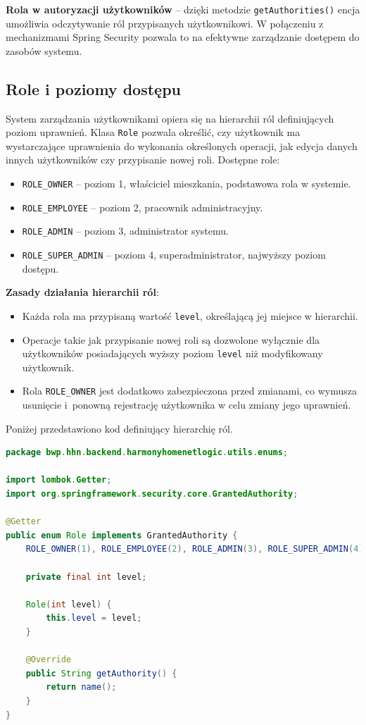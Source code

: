 \noindent \textbf{Rola w autoryzacji użytkowników} -- dzięki metodzie \texttt{getAuthorities()} encja umożliwia odczytywanie ról przypisanych użytkownikowi. W połączeniu z mechanizmami Spring Security pozwala to na efektywne zarządzanie dostępem do zasobów systemu.

\subsection{Role i poziomy dostępu}

System zarządzania użytkownikami opiera się na hierarchii ról definiujących poziom uprawnień. Klasa \texttt{Role} pozwala określić, czy użytkownik ma wystarczające uprawnienia do wykonania określonych operacji, jak edycja danych innych użytkowników czy przypisanie nowej roli. Dostępne role:
\begin{itemize}
    \item \texttt{ROLE\_OWNER} -- poziom 1, właściciel mieszkania, podstawowa rola w systemie.
    \item \texttt{ROLE\_EMPLOYEE} -- poziom 2, pracownik administracyjny.
    \item \texttt{ROLE\_ADMIN} -- poziom 3, administrator systemu.
    \item \texttt{ROLE\_SUPER\_ADMIN} -- poziom 4, superadministrator, najwyższy poziom dostępu.
\end{itemize}

\noindent \textbf{Zasady działania hierarchii ról}:
\begin{itemize}
    \item Każda rola ma przypisaną wartość \texttt{level}, określającą jej miejsce w hierarchii.
    \item Operacje takie jak przypisanie nowej roli są dozwolone wyłącznie dla użytkowników posiadających wyższy poziom \texttt{level} niż modyfikowany użytkownik.
    \item Rola \texttt{ROLE\_OWNER} jest dodatkowo zabezpieczona przed zmianami, co wymusza usunięcie i~ponowną rejestrację użytkownika w celu zmiany jego uprawnień.
\end{itemize}

\noindent Poniżej przedstawiono kod definiujący hierarchię ról.
\begin{lstlisting}[language=Java, style=JavaStyle, caption=Definicja ról w systemie \texttt{Role}]
package bwp.hhn.backend.harmonyhomenetlogic.utils.enums;

import lombok.Getter;
import org.springframework.security.core.GrantedAuthority;

@Getter
public enum Role implements GrantedAuthority {
    ROLE_OWNER(1), ROLE_EMPLOYEE(2), ROLE_ADMIN(3), ROLE_SUPER_ADMIN(4);

    private final int level;

    Role(int level) {
        this.level = level;
    }

    @Override
    public String getAuthority() {
        return name();
    }
}
\end{lstlisting}

